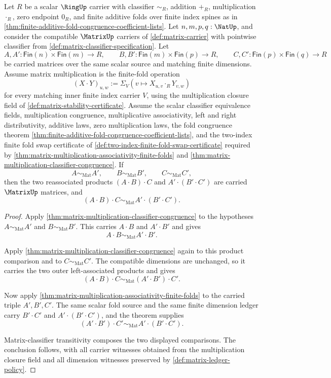 \begin{theorem}
\label{thm:matrix-multiplication-reassociation-classifier-transport}
Let $R$ be a scalar $\RingUp$ carrier with classifier $\sim_R$, addition $+_R$, multiplication $\cdot_R$, zero endpoint $0_R$, and finite additive folds over finite index spines as in \autoref{thm:finite-additive-fold-congruence-coefficient-lists}. Let $n,m,p,q:\NatUp$, and consider the compatible $\MatrixUp$ carriers of \autoref{def:matrix-carrier} with pointwise classifier from \autoref{def:matrix-classifier-specification}. Let
$$
A,A':\mathsf{Fin}(n)\times\mathsf{Fin}(m)\to R,
\qquad
B,B':\mathsf{Fin}(m)\times\mathsf{Fin}(p)\to R,
\qquad
C,C':\mathsf{Fin}(p)\times\mathsf{Fin}(q)\to R
$$
be carried matrices over the same scalar source and matching finite dimensions. Assume matrix multiplication is the finite-fold operation
$$
(X\cdot Y)_{u,w}:=\Sigma_V(v\mapsto X_{u,v}\cdot_RY_{v,w})
$$
for every matching inner finite index carrier $V$, using the multiplication closure field of \autoref{def:matrix-stability-certificate}. Assume the scalar classifier equivalence fields, multiplication congruence, multiplicative associativity, left and right distributivity, additive laws, zero multiplication laws, the fold congruence theorem \autoref{thm:finite-additive-fold-congruence-coefficient-lists}, and the two-index finite fold swap certificate of \autoref{def:two-index-finite-fold-swap-certificate} required by \autoref{thm:matrix-multiplication-associativity-finite-folds} and \autoref{thm:matrix-multiplication-classifier-congruence}. If
$$
A\sim_{\mathrm{Mat}}A',
\qquad
B\sim_{\mathrm{Mat}}B',
\qquad
C\sim_{\mathrm{Mat}}C',
$$
then the two reassociated products $(A\cdot B)\cdot C$ and $A'\cdot(B'\cdot C')$ are carried $\MatrixUp$ matrices, and
$$
(A\cdot B)\cdot C
\sim_{\mathrm{Mat}}
A'\cdot(B'\cdot C').
$$
\end{theorem}
\begin{proof}
Apply \autoref{thm:matrix-multiplication-classifier-congruence} to the hypotheses $A\sim_{\mathrm{Mat}}A'$ and $B\sim_{\mathrm{Mat}}B'$. This carries $A\cdot B$ and $A'\cdot B'$ and gives
$$
A\cdot B\sim_{\mathrm{Mat}}A'\cdot B'.
$$

Apply \autoref{thm:matrix-multiplication-classifier-congruence} again to this product comparison and to $C\sim_{\mathrm{Mat}}C'$. The compatible dimensions are unchanged, so it carries the two outer left-associated products and gives
$$
(A\cdot B)\cdot C
\sim_{\mathrm{Mat}}
(A'\cdot B')\cdot C'.
$$

Now apply \autoref{thm:matrix-multiplication-associativity-finite-folds} to the carried triple $A',B',C'$. The same scalar fold source and the same finite dimension ledger carry $B'\cdot C'$ and $A'\cdot(B'\cdot C')$, and the theorem supplies
$$
(A'\cdot B')\cdot C'
\sim_{\mathrm{Mat}}
A'\cdot(B'\cdot C').
$$

Matrix-classifier transitivity composes the two displayed comparisons. The conclusion follows, with all carrier witnesses obtained from the multiplication closure field and all dimension witnesses preserved by \autoref{def:matrix-ledger-policy}.
\end{proof}

